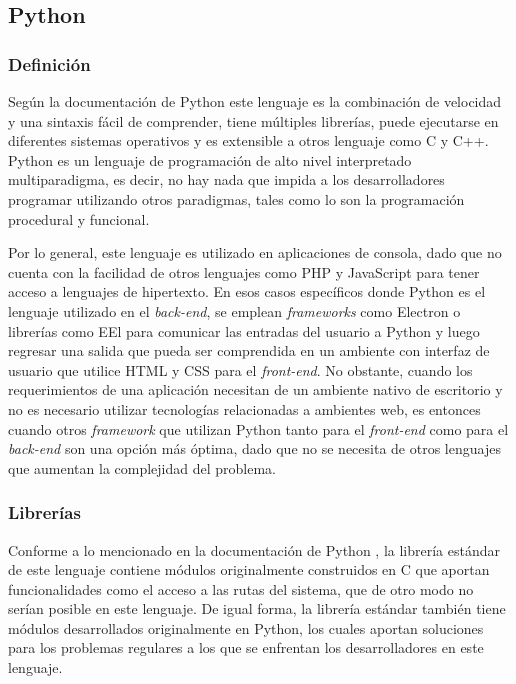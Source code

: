 \subsection{Python}
\subsubsection{Definición}
Según la documentación de Python \parencite{Pythondoc} este lenguaje es la combinación de velocidad y una sintaxis fácil de comprender, tiene múltiples librerías, puede ejecutarse en diferentes sistemas operativos y es extensible a otros lenguaje como C y C++. Python \parencite{Python3} es un lenguaje de programación de alto nivel interpretado multiparadigma, es decir, no hay nada que impida a los desarrolladores programar utilizando otros paradigmas, tales como lo son la programación procedural y funcional.

Por lo general, este lenguaje es utilizado en aplicaciones de consola, dado que no cuenta con la facilidad de otros lenguajes como PHP y JavaScript para tener acceso a lenguajes de hipertexto. En esos casos específicos donde Python es el lenguaje utilizado en el \textit{back-end}, se emplean \textit{frameworks} como Electron o librerías como EEl para comunicar las entradas del usuario a Python y luego regresar una salida que pueda ser comprendida en un ambiente con interfaz de usuario que utilice HTML y CSS para el \textit{front-end}. No obstante, cuando los requerimientos de una aplicación necesitan de un ambiente nativo de escritorio y no es necesario utilizar tecnologías relacionadas a ambientes web, es entonces cuando otros \textit{framework} que utilizan Python tanto para el \textit{front-end} como para el \textit{back-end} son una opción más óptima, dado que no se necesita de otros lenguajes que aumentan la complejidad del problema. 

\subsubsection{Librerías}
Conforme a lo mencionado en la documentación de Python \parencite{Pythondoc}, la librería estándar de este lenguaje contiene módulos originalmente construidos en C que aportan funcionalidades como el acceso a las rutas del sistema, que de otro modo no serían posible en este lenguaje. De igual forma, la librería estándar también tiene módulos desarrollados originalmente en Python, los cuales aportan soluciones para los problemas regulares a los que se enfrentan los desarrolladores en este lenguaje.

